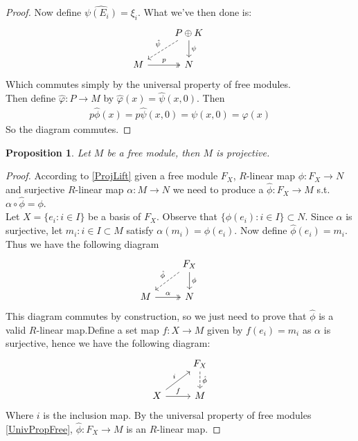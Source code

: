 \documentclass[12pt]{book}
\newtheorem{proposition}[theorem]{Proposition}
\theoremstyle{definition}
\begin{document}
\begin{proof}
    Now define $\hat{\psi(E_i)} = \xi_i$. What we've then done is: 
    \[
    \begin{tikzcd}
    & P \oplus K  \arrow[ld, dashed, "\hat{\psi}"'] \arrow[d, "\psi"] & \\
    M \arrow[r, two heads, "p"] & N &
    \end{tikzcd}
    \] 
    Which commutes simply by the universal property of free modules.\\
    Then define $\hat{\varphi} : P \to M$ by $\hat{\varphi}(x) = \hat{\psi}(x,0)$. Then
    \begin{align*}
        p \hat{\phi} (x) = p \hat{\psi} (x,0) = \psi(x,0) = \varphi(x)
    \end{align*}
    So the diagram commutes. 
\end{proof}

\begin{proposition}
    Let $M$ be a free module, then $M$ is projective. 
\end{proposition}
\begin{proof}
    According to \ref{ProjLift} given a free module $F_X$, $R$-linear map $\phi: F_X \to N$ and surjective $R$-linear map $\alpha : M \to N$ we need to produce a $\hat{\phi} : F_X \to M$ s.t. $\alpha \circ \hat{\phi} = \phi$.\\ 
    Let $X = \{e_i : i \in I \}$ be a basis of $F_X$. Observe that $\{\phi(e_i) : i \in I\} \subset N$. Since $\alpha$ is surjective, let ${m_i : i \in I} \subset M$ satisfy $\alpha(m_i) = \phi(e_i)$. Now define $\hat{\phi}(e_i) = m_i$. Thus we have the following diagram
    \[
    \begin{tikzcd}
    & F_X \arrow[ld, dashed, "\hat{\phi}"'] \arrow[d, "\phi"] & \\
    M \arrow[r, two heads, "\alpha"] & N &
    \end{tikzcd}
    \] 
    This diagram commutes by construction, so we just need to prove that $\hat{\phi}$ is a valid $R$-linear map.Define a set map $f : X \to M$ given by $f(e_i) = m_i$ as $\alpha$ is surjective, hence we have the following diagram: 
    \[
    \begin{tikzcd}
        & F_X \arrow[d, dashed, "\hat{\phi}"] \\
        X \arrow[ur, "i"] \arrow[r, "f"] & M
    \end{tikzcd}
    \]
    Where $i$ is the inclusion map. By the universal property of free modules \ref{UnivPropFree}, $\hat{\phi}: F_X \to M$ is an $R$-linear map. 
\end{proof}
\end{document}
